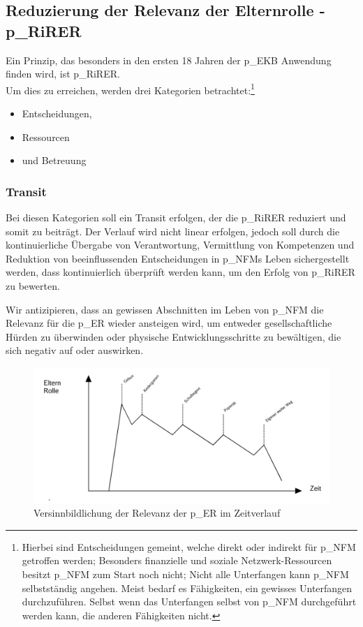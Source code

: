 \subsection{Reduzierung der Relevanz der Elternrolle - \gls{p_RiRER}}

Ein Prinzip, das besonders in den ersten 18 Jahren der \gls{p_EKB} Anwendung finden wird, ist \gls{p_RiRER}.\\


Um dies zu erreichen, werden drei Kategorien betrachtet:\footnote{
	Hierbei sind Entscheidungen gemeint, welche direkt oder indirekt für \gls{p_NFM} getroffen werden; Besonders finanzielle und soziale Netzwerk-Ressourcen besitzt \gls{p_NFM} zum Start noch nicht; Nicht alle Unterfangen kann \gls{p_NFM} selbstständig angehen. Meist bedarf es Fähigkeiten, ein gewisses Unterfangen durchzuführen. Selbst wenn das Unterfangen selbst von \gls{p_NFM} durchgeführt werden kann, die anderen Fähigkeiten nicht.
} 
\begin{itemize}
	\item Entscheidungen,
	\item Ressourcen
	\item und Betreuung
\end{itemize}

\subsubsection{Transit}
Bei diesen Kategorien soll ein Transit erfolgen, der die \gls{p_RiRER} reduziert und somit zu  beiträgt. Der Verlauf wird nicht linear erfolgen, jedoch soll durch die kontinuierliche Übergabe von Verantwortung, Vermittlung von Kompetenzen und Reduktion von beeinflussenden Entscheidungen in \gls{p_NFM}s Leben sichergestellt werden, dass  kontinuierlich überprüft werden kann, um den Erfolg von \gls{p_RiRER} zu bewerten. 

Wir antizipieren, dass an gewissen Abschnitten im Leben von \gls{p_NFM} die Relevanz für die \gls{p_ER} wieder ansteigen wird, um entweder gesellschaftliche Hürden zu überwinden oder physische Entwicklungsschritte zu bewältigen, die sich negativ auf  oder \NFMOTwo auswirken.

\begin{figure}[H]
	\centering
	\includegraphics[scale = 0.3]{attachment/chapter_OWN/Scc005.png}
	\caption{Versinnbildlichung der Relevanz der \gls{p_ER} im Zeitverlauf}
\end{figure} 

